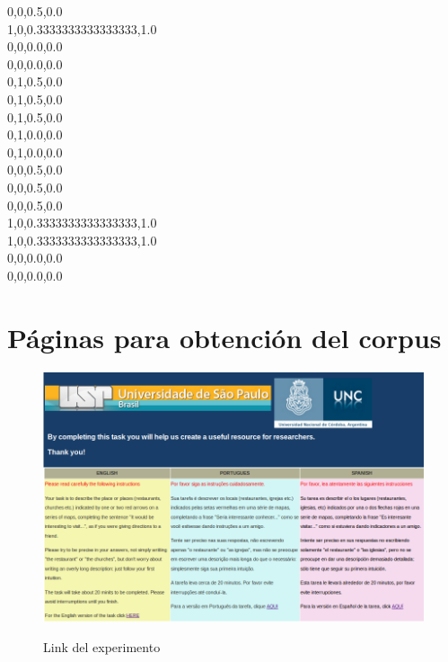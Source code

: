 0,0,0.5,0.0\\
1,0,0.3333333333333333,1.0\\
0,0,0.0,0.0\\
0,0,0.0,0.0\\
0,1,0.5,0.0\\
0,1,0.5,0.0\\
0,1,0.5,0.0\\
0,1,0.0,0.0\\
0,1,0.0,0.0\\
0,0,0.5,0.0\\
0,0,0.5,0.0\\
0,0,0.5,0.0\\
1,0,0.3333333333333333,1.0\\
1,0,0.3333333333333333,1.0\\
0,0,0.0,0.0\\
0,0,0.0,0.0\\



\chapter{P\'aginas para obtenci\'on del corpus}
\label{corpus-apendice}

\begin{figure}[ht]
\begin{center}
\includegraphics[width=13cm]{images/pagPrincipal.png}\\[0pt]
\caption{Link del experimento}
\label{fig-pagPrincipal}
\end{center}
\end{figure}

